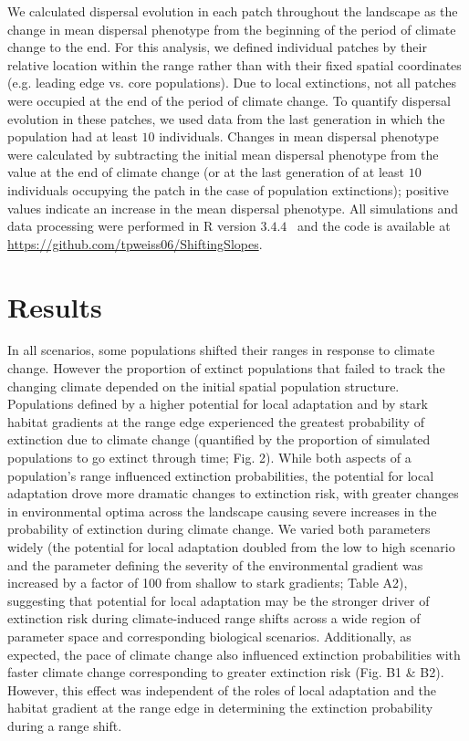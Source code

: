 \documentclass[12pt, oneside]{article}
\begin{document}
We calculated dispersal evolution in each patch throughout the landscape as the change in mean dispersal phenotype from the beginning of the period of climate change to the end. For this analysis, we defined individual patches by their relative location within the range rather than with their fixed spatial coordinates (e.g. leading edge vs. core populations). Due to local extinctions, not all patches were occupied at the end of the period of climate change. To quantify dispersal evolution in these patches, we used data from the last generation in which the population had at least $10$ individuals. Changes in mean dispersal phenotype were calculated by subtracting the initial mean dispersal phenotype from the value at the end of climate change (or at the last generation of at least $10$ individuals occupying the patch in the case of population extinctions); positive values indicate an increase in the mean dispersal phenotype. All simulations and data processing were performed in R version $3.4.4$~\citep{team2000r} and the code is available at \url{https://github.com/tpweiss06/ShiftingSlopes}.

\section*{Results}
In all scenarios, some populations shifted their ranges in response to climate change. However the proportion of extinct populations that failed to track the changing climate depended on the initial spatial population structure. Populations defined by a higher potential for local adaptation and by stark habitat gradients at the range edge experienced the greatest probability of extinction due to climate change (quantified by the proportion of simulated populations to go extinct through time; Fig. 2). While both aspects of a population's range influenced extinction probabilities, the potential for local adaptation drove more dramatic changes to extinction risk, with greater changes in environmental optima across the landscape causing severe increases in the probability of extinction during climate change. We varied both parameters widely (the potential for local adaptation doubled from the low to high scenario and the parameter defining the severity of the environmental gradient was increased by a factor of 100 from shallow to stark gradients; Table A2), suggesting that potential for local adaptation may be the stronger driver of extinction risk during climate-induced range shifts across a wide region of parameter space and corresponding biological scenarios. Additionally, as expected, the pace of climate change also influenced extinction probabilities with faster climate change corresponding to greater extinction risk (Fig. B1 \& B2). However, this effect was independent of the roles of local adaptation and the habitat gradient at the range edge in determining the extinction probability during a range shift.
\end{document}
